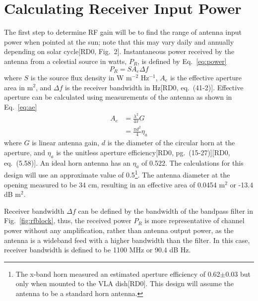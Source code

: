 \documentclass[titlepage]{article}
\newcommand{\nraocite}[1]{[RD0\cite{#1}]}
\newcommand{\nraoprecite}[2][]{[RD0\cite{#2}{, #1}]}
\begin{document}
\section{Calculating Receiver Input Power}
The first step to determine RF gain will be to find the range of antenna input power when pointed at the sun; note that this may vary daily and annually depending on solar cycle\nraoprecite[Fig.~2]{solartemp}. Instantaneous power received by the antenna from a celestial source in watts, $P_R$, is defined by Eq.~\ref{eq:power}
\begin{equation}
    P_R = S A_e \Delta f
\label{eq:power}
\end{equation}
where $S$ is the source flux density in W m$^{-2}$ Hz$^{-1}$, $A_e$ is the effective aperture area in m$^2$, and $\Delta f$ is the receiver bandwidth in Hz\nraoprecite[eq.~(41-2)]{aeh}. Effective aperture can be calculated using measurements of the antenna as shown in Eq.~\ref{eq:ae}
\begin{equation} \label{eq:ae}
\begin{split}
    A_e &= \frac{\lambda^2}{4\pi}G \\
    &= \frac{\pi d^2}{4} \eta_a
\end{split}
\end{equation}
where $G$ is linear antenna gain, $d$ is the diameter of the circular horn at the aperture, and $\eta_a$ is the unitless aperture efficiency\nraoprecite[pg.~(15-27)]{aeh}\nraoprecite[eq.~(5.58)]{tora}. An ideal horn antenna has an $\eta_a$ of 0.522. The calculations for this design will use an approximate value of 0.5\footnote{The x-band horn measured an estimated aperture efficiency of 0.62$\pm$0.03 but only when mounted to the VLA dish\nraocite{xbandvla}. This design will assume the antenna to be a standard horn antenna.}. The antenna diameter at the opening measured to be 34 cm, resulting in an effective area of 0.0454 m$^2$ or -13.4 dB m$^2$.

Receiver bandwidth $\Delta f$ can be defined by the bandwidth of the bandpass filter in Fig.~\ref{fig:rfblock}, thus, the received power $P_R$ is more representative of channel power without any amplification, rather than antenna output power, as the antenna is a wideband feed with a higher bandwidth than the filter. In this case, receiver bandwidth is defined to be 1100 MHz or 90.4 dB Hz.
\end{document}
